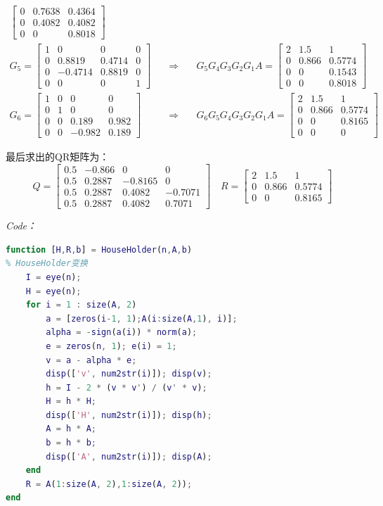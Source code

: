 \documentclass[12pt]{ctexart}
\begin{document}
\begin{equation*}
\begin{aligned}
\begin{bmatrix}
	0&0.7638&0.4364 \\
	0&0.4082&0.4082 \\
	0&0&0.8018
	\end{bmatrix} \\
	G_5=\begin{bmatrix}
	1&0&0&0 \\
	0&0.8819&0.4714&0 \\
	0&-0.4714&0.8819&0 \\
	0&0&0&1
	\end{bmatrix} &\quad\Rightarrow\quad
	&G_5G_4G_3G_2G_1A=\begin{bmatrix}
	2&1.5&1 \\
	0&0.866&0.5774 \\
	0&0&0.1543 \\
	0&0&0.8018
	\end{bmatrix} \\
	G_6=\begin{bmatrix}
	1&0&0&0 \\
	0&1&0&0 \\
	0&0&0.189&0.982 \\
	0&0&-0.982&0.189
	\end{bmatrix} &\quad\Rightarrow\quad
	&G_6G_5G_4G_3G_2G_1A=\begin{bmatrix}
	2&1.5&1 \\
	0&0.866&0.5774 \\
	0&0&0.8165 \\
	0&0&0
	\end{bmatrix}
	\end{aligned}
	\end{equation*}
	
	最后求出的QR矩阵为：
	\[
	Q=\begin{bmatrix}
		0.5&-0.866&0&0 \\
		0.5&0.2887&-0.8165&0 \\
		0.5&0.2887&0.4082&-0.7071 \\
		0.5&0.2887&0.4082&0.7071
	\end{bmatrix} \quad
	R=\begin{bmatrix}
		2&1.5&1 \\
		0&0.866&0.5774 \\
		0&0&0.8165
	\end{bmatrix}
	\]
	
	\textit{Code：}
	
\begin{lstlisting}[language = MATLAB]
function [H,R,b] = HouseHolder(n,A,b)
% HouseHolder变换
	I = eye(n);
	H = eye(n);
	for i = 1 : size(A, 2)
		a = [zeros(i-1, 1);A(i:size(A,1), i)];
		alpha = -sign(a(i)) * norm(a);
		e = zeros(n, 1); e(i) = 1;
		v = a - alpha * e;
		disp(['v', num2str(i)]); disp(v);
		h = I - 2 * (v * v') / (v' * v);
		H = h * H;
		disp(['H', num2str(i)]); disp(h);
		A = h * A;
		b = h * b;
		disp(['A', num2str(i)]); disp(A);
	end
	R = A(1:size(A, 2),1:size(A, 2));
end
\end{lstlisting}
\end{document}
